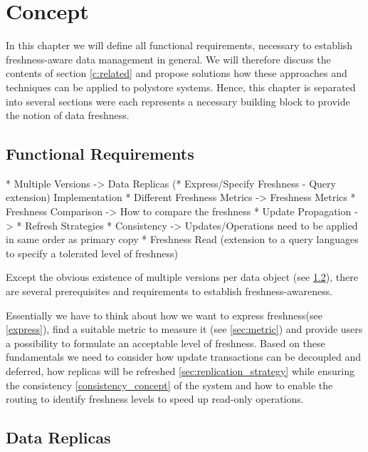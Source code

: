 \chapter{Concept}
\label{c:concept}


In this chapter we will define all functional requirements, necessary to establish freshness-aware data management in general.
We will therefore discuss the contents of section \ref{c:related} and propose solutions how these approaches and techniques can be applied to polystore systems.
Hence, this chapter is separated into several sections were each represents a necessary building block to provide the notion of data freshness.


\section{Functional Requirements}

* Multiple Versions -> Data Replicas
(* Express/Specify Freshness - Query extension) Implementation
* Different Freshness Metrics -> Freshness Metrics 
* Freshness Comparison -> How to compare the freshness
* Update Propagation -> 
* Refresh Strategies
* Consistency -> Updates/Operations need to be applied in same order as primary copy
* Freshness Read
 (extension to a query languages to specify a tolerated level of freshness)


Except the obvious existence of multiple versions per data object (see \ref{sec:data_replicas}), there are several prerequisites and requirements to establish freshness-awareness. 

Essentially we have to think about how we want to express freshness(see \ref{express}), find a suitable metric to measure it (see \ref{sec:metric})
and provide users a possibility to formulate an acceptable level of freshness. Based on these fundamentals we need to consider how update transactions 
can be decoupled and deferred, how replicas will
be refreshed \ref{sec:replication_strategy} while ensuring the consistency \ref{consistency_concept} of the system and how to enable the routing to identify freshness levels to speed up read-only operations. 






\section{Data Replicas}
\label{sec:data_replicas}

